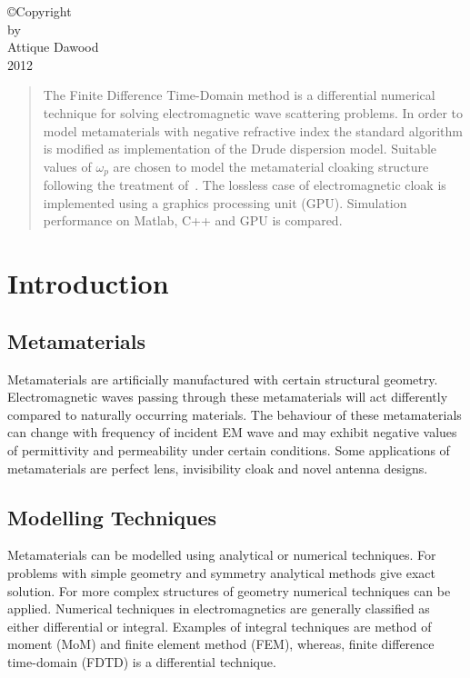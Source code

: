 \documentclass{report}
\begin{document}


\begin{center}
\copyright Copyright\\[0.2in]
by\\[0.2in]
Attique Dawood\\[0.2in]
2012
\end{center}



\tableofcontents
\listoffigures

\begin{abstract}
The Finite Difference Time-Domain method is a differential numerical technique for solving electromagnetic wave scattering problems. In order to model metamaterials with negative refractive index the standard algorithm is modified as implementation of the Drude dispersion model. Suitable values of $\omega_p$  are chosen to model the metamaterial cloaking structure following the treatment of~\cite{Radial-Zhao}. The lossless case of electromagnetic cloak is implemented using a graphics processing unit (GPU). Simulation performance on Matlab, C++ and GPU is compared.
\end{abstract}

\chapter{Introduction}
\section{Metamaterials}
Metamaterials are artificially manufactured with certain structural geometry. Electromagnetic waves passing through these metamaterials will act differently compared to naturally occurring materials. The behaviour of these metamaterials can change with frequency of incident EM wave and may exhibit negative values of permittivity and permeability under certain conditions. Some applications of metamaterials are perfect lens, invisibility cloak and novel antenna designs.

\section{Modelling Techniques}
Metamaterials can be modelled using analytical or numerical techniques. For problems with simple geometry and symmetry analytical methods give exact solution. For more complex structures of geometry numerical techniques can be applied. Numerical techniques in electromagnetics are generally classified as either differential or integral. Examples of integral techniques are method of moment (MoM) and finite element method (FEM), whereas, finite difference time-domain (FDTD) is a differential technique.
\end{document}
